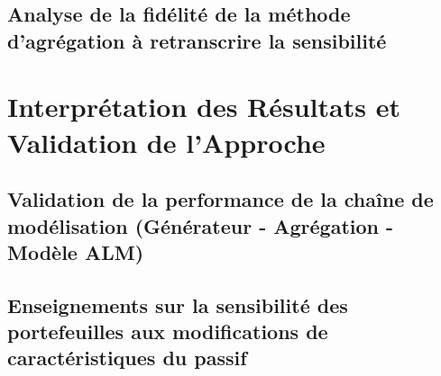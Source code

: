     \subsection{Analyse de la fidélité de la méthode d'agrégation à retranscrire la sensibilité}

\section{Interprétation des Résultats et Validation de l'Approche}
    \subsection{Validation de la performance de la chaîne de modélisation (Générateur - Agrégation - Modèle ALM)}
    \subsection{Enseignements sur la sensibilité des portefeuilles aux modifications de caractéristiques du passif}






